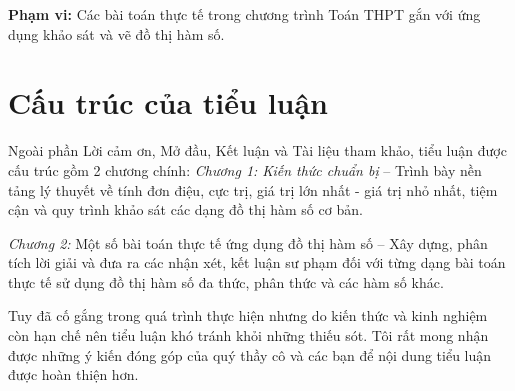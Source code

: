 \documentclass[12pt,a4paper,oneside]{book}
\theoremstyle{theorem}
\theoremstyle{definition}
\begin{document}
           \textbf{Phạm vi:} Các bài toán thực tế trong chương trình Toán THPT gắn với ứng dụng khảo sát và vẽ đồ thị hàm số.  
           
           \section*{ Cấu trúc của tiểu luận} 
           Ngoài phần Lời cảm ơn, Mở đầu, Kết luận và Tài liệu tham khảo, tiểu luận được cấu trúc gồm 2 chương chính:   \textit{Chương 1: Kiến thức chuẩn bị} – Trình bày nền tảng lý thuyết về tính đơn điệu, cực trị, giá trị lớn nhất - giá trị nhỏ nhất, tiệm cận và quy trình khảo sát các dạng đồ thị hàm số cơ bản.   
           
           \textit{Chương 2:} Một số bài toán thực tế ứng dụng đồ thị hàm số – Xây dựng, phân tích lời giải và đưa ra các nhận xét, kết luận sư phạm đối với từng dạng bài toán thực tế sử dụng đồ thị hàm số đa thức, phân thức và các hàm số khác.   
            
           
            Tuy đã cố gắng trong quá trình thực hiện nhưng do kiến thức và kinh nghiệm còn hạn chế nên tiểu luận khó tránh khỏi những thiếu sót. Tôi rất mong nhận được những ý kiến đóng góp của quý thầy cô và các bạn để nội dung tiểu luận được hoàn thiện hơn.

	
	
   
\end{document}
